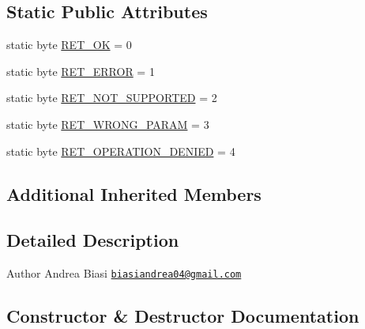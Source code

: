 \subsection*{Static Public Attributes}
\begin{DoxyCompactItemize}
\item 
static byte \hyperlink{classit_1_1polito_1_1elite_1_1enocean_1_1protocol_1_1serial_1_1v3_1_1network_1_1packet_1_1response_1_1_response_a7eab334bb1a3dacdef796b877a8c69ab}{R\+E\+T\+\_\+\+OK} = 0
\item 
static byte \hyperlink{classit_1_1polito_1_1elite_1_1enocean_1_1protocol_1_1serial_1_1v3_1_1network_1_1packet_1_1response_1_1_response_ab187c9c92d38ccbb9967796067de8ff0}{R\+E\+T\+\_\+\+E\+R\+R\+OR} = 1
\item 
static byte \hyperlink{classit_1_1polito_1_1elite_1_1enocean_1_1protocol_1_1serial_1_1v3_1_1network_1_1packet_1_1response_1_1_response_ae3723004618678840c333793b11702b2}{R\+E\+T\+\_\+\+N\+O\+T\+\_\+\+S\+U\+P\+P\+O\+R\+T\+ED} = 2
\item 
static byte \hyperlink{classit_1_1polito_1_1elite_1_1enocean_1_1protocol_1_1serial_1_1v3_1_1network_1_1packet_1_1response_1_1_response_a84e77a2371ac0b20e982daddb03eaea0}{R\+E\+T\+\_\+\+W\+R\+O\+N\+G\+\_\+\+P\+A\+R\+AM} = 3
\item 
static byte \hyperlink{classit_1_1polito_1_1elite_1_1enocean_1_1protocol_1_1serial_1_1v3_1_1network_1_1packet_1_1response_1_1_response_a03a9c53d574ea64b4d4d3b79080735ec}{R\+E\+T\+\_\+\+O\+P\+E\+R\+A\+T\+I\+O\+N\+\_\+\+D\+E\+N\+I\+ED} = 4
\end{DoxyCompactItemize}
\subsection*{Additional Inherited Members}


\subsection{Detailed Description}
\begin{DoxyAuthor}{Author}
Andrea Biasi \href{mailto:biasiandrea04@gmail.com}{\tt biasiandrea04@gmail.\+com} 
\end{DoxyAuthor}


\subsection{Constructor \& Destructor Documentation}
\hypertarget{classit_1_1polito_1_1elite_1_1enocean_1_1protocol_1_1serial_1_1v3_1_1network_1_1packet_1_1response_1_1_response_a383d898cbc2cabaa4fd6032ed19da446}{}\label{classit_1_1polito_1_1elite_1_1enocean_1_1protocol_1_1serial_1_1v3_1_1network_1_1packet_1_1response_1_1_response_a383d898cbc2cabaa4fd6032ed19da446} 
